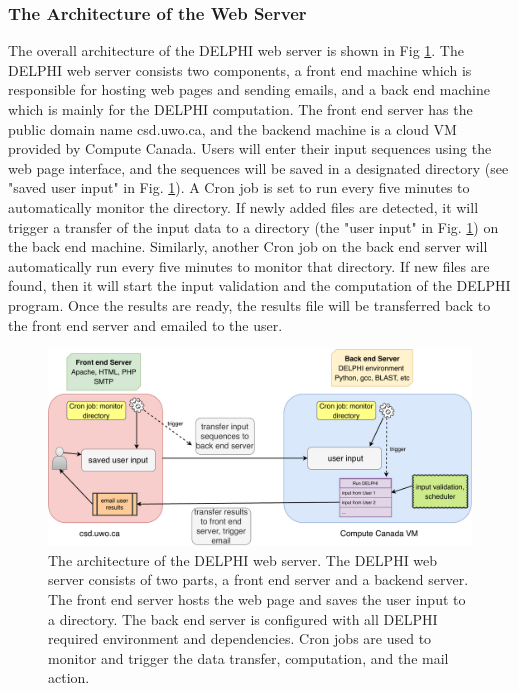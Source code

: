 \subsubsection{The Architecture of the Web Server}
The overall architecture of the DELPHI web server is shown in Fig \ref{fig_DELPHI_web_arch}. The DELPHI web server consists two components, a front end machine which is responsible for hosting web pages and sending emails, and a back end machine which is mainly for the DELPHI computation. The front end server has the public domain name csd.uwo.ca, and the backend machine is a cloud VM provided by Compute Canada. Users will enter their input sequences using the web page interface, and the sequences will be saved in a designated directory (see "saved user input" in Fig. \ref{fig_DELPHI_web_arch}). A Cron job is set to run every five minutes to automatically monitor the directory. If newly added files are detected, it will trigger a transfer of the input data to a directory (the "user input" in Fig. \ref{fig_DELPHI_web_arch}) on the back end machine. Similarly, another Cron job on the back end server will automatically run every five minutes to monitor that directory. If new files are found, then it will start the input validation and the computation of the DELPHI program. Once the results are ready, the results file will be transferred back to the front end server and emailed to the user.
\begin{figure}[h!]
\begin{center}
\includegraphics[width =13 cm]{img/DELPHI_webserver_architecture.pdf}
\caption[The architecture of the DELPHI web server]{The architecture of the DELPHI web server. The DELPHI web server consists of two parts, a front end server and a backend server. The front end server hosts the web page and saves the user input to a directory. The back end server is configured with all DELPHI required environment and dependencies. Cron jobs are used to monitor and trigger the data transfer, computation, and the mail action. \label{fig_DELPHI_web_arch}}
\end{center}
\end{figure} 

